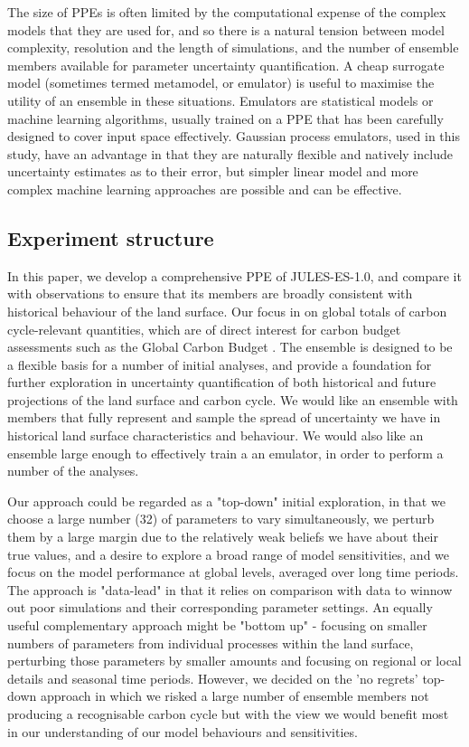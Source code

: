 \documentclass[gmd, manuscript]{copernicus}
\begin{document}
The size of PPEs is often limited by the computational expense of the complex models that they are used for, and so there is a natural tension between model complexity, resolution and the length of simulations, and the number of ensemble members available for parameter uncertainty quantification. A cheap surrogate model (sometimes termed metamodel, or emulator) is useful to maximise the utility of an ensemble in these situations. Emulators are statistical models or machine learning algorithms, usually trained on a PPE that has been carefully designed to cover input space effectively. Gaussian process emulators, used in this study, have an advantage in that they are naturally flexible and natively include uncertainty estimates as to their error, but simpler linear model and more complex machine learning approaches are possible and can be effective.

\subsection{Experiment structure}\label{ssec:experiment_structure}

In this paper, we develop a comprehensive PPE of JULES-ES-1.0, and compare it with observations to ensure that its members are broadly consistent with historical behaviour of the land surface. Our focus in on global totals of carbon cycle-relevant quantities, which are of direct interest for carbon budget assessments such as the Global Carbon Budget \citep{essd-14-1917-2022}. The ensemble is designed to be a flexible basis for a number of initial analyses, and provide a foundation for further exploration in uncertainty quantification of both historical and future projections of the land surface and carbon cycle.  We would like an ensemble with members that fully represent and sample the spread of uncertainty we have in historical land surface characteristics and behaviour. We would also like an ensemble large enough to effectively train a an emulator, in order to perform a number of the analyses.

Our approach could be regarded as a "top-down" initial exploration, in that we choose a large number (32) of parameters to vary simultaneously, we perturb them by a large margin due to the relatively weak beliefs we have about their true values, and a desire to explore a broad range of model sensitivities, and we focus on the model performance at global levels, averaged over long time periods. The approach is "data-lead" in that it relies on comparison with data to winnow out poor simulations and their corresponding parameter settings. An equally useful complementary approach might be "bottom up" - focusing on smaller numbers of parameters from individual processes within the land surface, perturbing those parameters by smaller amounts and focusing on regional or local details and seasonal time periods. However, we decided on the 'no regrets' top-down approach in which we risked a large number of ensemble members not producing a recognisable carbon cycle but with the view we would benefit most in our understanding of our model behaviours and sensitivities.
\end{document}
